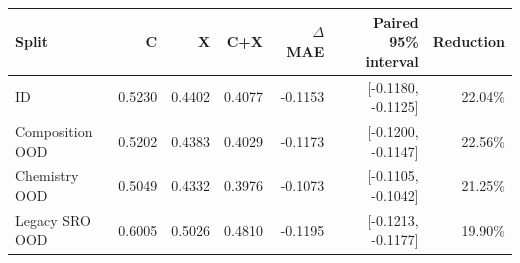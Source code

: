 \small\setlength{\tabcolsep}{5pt}
\begin{tabular}{@{}lrrrrrr@{}}
\toprule
Split & C & X & C+X & $\Delta$ MAE & Paired 95\% interval & Reduction \\
\midrule
ID & 0.5230 & 0.4402 & 0.4077 & -0.1153 & [-0.1180, -0.1125] & 22.04\% \\
Composition OOD & 0.5202 & 0.4383 & 0.4029 & -0.1173 & [-0.1200, -0.1147] & 22.56\% \\
Chemistry OOD & 0.5049 & 0.4332 & 0.3976 & -0.1073 & [-0.1105, -0.1042] & 21.25\% \\
Legacy SRO OOD & 0.6005 & 0.5026 & 0.4810 & -0.1195 & [-0.1213, -0.1177] & 19.90\% \\
\bottomrule
\end{tabular}
